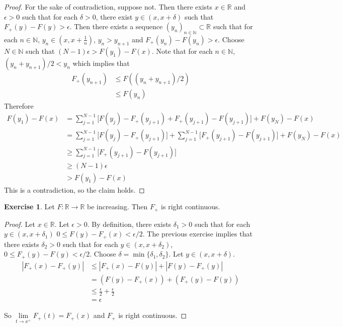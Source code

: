 \documentclass{book}
\theoremstyle{definition}
\newtheorem{ex}[definition]{Exercise}
\newcommand{\del}{\delta}
\newcommand{\ep}{\epsilon}
\newcommand{\N}{\mathbb{N}}
\newcommand{\R}{\mathbb{R}}
\newcommand{\lex}[1]{\label{ex:#1}}
\DeclareMathOperator*{\0}{\mbf{0}}
\DeclareMathOperator*{\1}{\mbf{1}}
\begin{document}
	\begin{proof}
		For the sake of contradiction, suppose not. Then there exists $x \in \R$ and $\ep >0$ such that for each $\del >0$, there exist $y \in (x,x+\del)$ such that $F_+(y) - F(y) > \ep$. Then there exists a sequence $(y_n)_{n \in \N} \subset \R$ such that for each $n \in \N$, $y_n \in (x, x+\frac{1}{n})$, $y_n > y_{n+1}$ and $F_+(y_n) - F(y_n) > \ep$. Choose $N \in \N$ such that $(N-1)\ep > F(y_1) - F(x)$. Note that for each $n \in \N$, $(y_n + y_{n+1})/ 2 < y_n$ which implies that
		\begin{align*}
			F_+(y_{n+1})
			& \leq F((y_n + y_{n+1})/ 2) \\
			& \leq F(y_n)
		\end{align*}
		Therefore
		\begin{align*}
			F(y_1) - F(x) 
			&= \sum_{j=1}^{N-1} \bigg[F(y_j)-F_+(y_{j+1}) + F_+(y_{j+1}) - F(y_{j+1}) \bigg] + F(y_N)- F(x)\\
			& = \sum_{j=1}^{N-1} \bigg[F(y_j)-F_+(y_{j+1}) \bigg] + \sum_{j=1}^{N-1} \bigg[ F_+(y_{j+1}) - F(y_{j+1}) \bigg] + F(y_N)- F(x) \\
			& \geq \sum_{j=1}^{N-1} \bigg[ F_+(y_{j+1}) - F(y_{j+1}) \bigg]  \\
			& \geq (N-1)\ep \\
			& > F(y_1) - F(x)
		\end{align*}
		This is a contradiction, so the claim holds.
	\end{proof}
	
	\begin{ex} \lex{00000} 
		Let $F:\R \rightarrow \R$ be increasing. Then $F_+$ is right continuous. 
	\end{ex}
	
	\begin{proof}
		Let $x \in \R$. Let $\ep >0$. By definition, there exists $\del_1>0$ such that for each $y \in (x,x+\del_1)$ $0 \leq F(y)-F_+(x) < \ep/2$. The previous exercise implies that there exists $\del_2 >0$ such that for each $y \in (x,x+\del_2)$, $0 \leq F_+(y)-F(y) < \ep/2$. Choose $\del = \min\{\del_1, \del_2\}$. Let $y \in (x, x+\del)$.
		\begin{align*}
			|F_+(x) - F_+(y)|
			& \leq |F_+(x) - F(y)| + |F(y)- F_+(y)| \\
			& = (F(y) - F_+(x)) + (F_+(y) - F(y)) \\
			& \leq \frac{\ep}{2} + \frac{\ep}{2}\\
			& = \ep
		\end{align*}
		
		So $\lim\limits_{t \rightarrow x^+} F_+(t) = F_+(x)$ and $F_+$ is right continuous.
	\end{proof}
	
\end{document}
